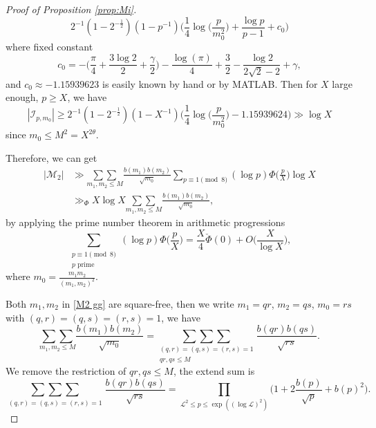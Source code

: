 \documentclass[10pt,a4paper]{amsart}
\begin{document}
\begin{proof}[Proof of Proposition \ref{prop:Mi}]
\begin{equation}
  2^{-1}(1-2^{-\frac{1}{2}})
(1-p^{-1})\Big(\frac{1}{4}\log\bigg(\frac{p}{m_0^2}\bigg)
+\frac{\log p}{p-1}+ c_0
\Big)
\end{equation}
where fixed constant
\begin{equation*}
  c_0=-\bigg(\frac{\pi}{4}+\frac{3\log 2}{2} +\frac{\gamma}{2}\bigg)
-\frac{\log(\pi)}{4}
+\frac{3}{2}-\frac{\log 2}{2\sqrt{2}-2}+\gamma,
\end{equation*}
and $c_0\approx -1.15939623$ is easily known by hand or by MATLAB.
Then for $X$ large enough, $p\geq X$, we have
\begin{equation*}
  |\mathcal{I}_{p,m_0}|\geq
  2^{-1}(1-2^{-\frac{1}{2}})
(1-X^{-1})\bigg(\frac{1}{4}
\log\bigg(\frac{p}{m_0^2}\bigg)
-1.15939624\bigg)
\gg \log X
\end{equation*}
since $m_0\le M^2=X^{2\theta}$.

Therefore, we can get
\begin{equation}\label{M2 gg}
\begin{split}
  |\mathcal{M}_2|&\gg
 \underset{m_1,m_2\leq M}{\sum\sum}
  \frac{b(m_1)b(m_2)}{\sqrt{m_0}}
  \sum_{p\equiv 1\pmod 8 }
  (\log p)\Phi\bigg(\frac{p}{X}\bigg)\log X\\
  &\gg_\Phi X\log X
  \underset{m_1,m_2\leq M}{\sum\sum}
  \frac{b(m_1)b(m_2)}{\sqrt{m_0}},
  \end{split}
\end{equation}
by applying the prime number theorem in arithmetic progressions
\begin{equation*}
  \sum_{\substack{p\equiv 1\pmod 8 \\ p \textrm{ prime }}}
  (\log p)\Phi\bigg(\frac{p}{X}\bigg)
  =\frac{X}{4}\check{\Phi}(0)+O\bigg(\frac{X}{\log X}\bigg),
\end{equation*}
where $m_0=\frac{m_1m_2}{(m_1, m_2)^2}$.

Both $m_1,m_2$ in \eqref{M2 gg} are square-free, then we write $m_1=qr$, $m_2=qs$, $m_0=rs$ with $(q,r)=(q,s)=(r,s)=1$, we have
\begin{equation}\label{truncated sum}
    \underset{m_1,m_2\leq M}{\sum\sum}
  \frac{b(m_1)b(m_2)}{\sqrt{m_0}}
  =\underset{\substack{(q,r)=(q,s)=(r,s)=1
  \\qr,qs\leq M}}
  {\sum\sum\sum}
  \frac{b(qr)b(qs)}{\sqrt{rs}}.
\end{equation}
We remove the restriction of $qr,qs\leq M$, the extend sum is
\begin{equation}\label{complete sum}
\underset{\substack{(q,r)=(q,s)=(r,s)=1}}
  {\sum\sum\sum}
  \frac{b(qr)b(qs)}{\sqrt{rs}}
    =\prod_{\mathcal{L}^2\leq p \leq \exp((\log \mathcal{L})^2)}
  \bigg(1+2\frac{b(p)}{\sqrt{p}}+b(p)^2\bigg).
\end{equation}


\end{proof}
\end{document}
